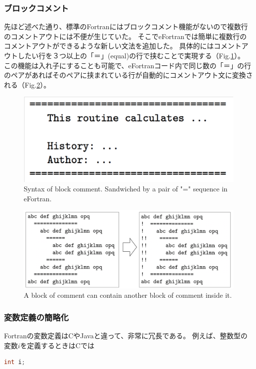 \documentclass[12pt]{jsarticle}
\begin{document}
\subsubsection{ブロックコメント}
先ほど述べた通り、標準のFortranにはブロックコメント機能がないので複数行のコメントアウトには不便が生じていた。
そこでeFortranでは簡単に複数行のコメントアウトができるような新しい文法を追加した。
具体的にはコメントアウトしたい行を３つ以上の「＝」(equal)の行で挟むことで実現する（Fig.\ref{block-comment2}）。
この機能は入れ子にすることも可能で、eFortranコード内で同じ数の「＝」の行のペアがあればそのペアに挟まれている行が自動的にコメントアウト文に変換される（Fig.\ref{block-comment3}）。

\begin{figure}[H]
\centering
\includegraphics[height=0.5\textheight,width=1.0\hsize,angle=0,keepaspectratio]{./Image/block_comment2.png}
\caption{Syntax of block comment. Sandwiched by a pair of "=" sequence in eFortran.} \label{block-comment2}
\end{figure}
\begin{figure}[H]
\includegraphics[height=0.5\textheight,width=1.0\hsize,angle=0,keepaspectratio]{./Image/block_comment3.png}
\caption{A block of comment can contain another block of comment inside it.} \label{block-comment3}
\end{figure}

\subsubsection{変数定義の簡略化}
Fortranの変数定義はCやJavaと違って、非常に冗長である。
例えば、整数型の変数$i$を定義するときはCでは
\begin{lstlisting}[language=c++]
int i;
\end{lstlisting}
\end{document}
